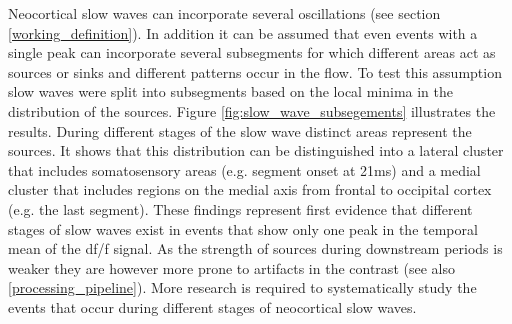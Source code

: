 Neocortical slow waves can incorporate several oscillations (see section \ref{working_definition}). In addition it can be assumed that even events with a single peak can incorporate several subsegments for which different areas act as sources or sinks and different patterns occur in the flow. To test this assumption slow waves were split into subsegments based on the local minima in the distribution of the sources. Figure \ref{fig:slow_wave_subsegements} illustrates the results. During different stages of the slow wave distinct areas represent the sources. It shows that this distribution can be distinguished into a lateral cluster that includes somatosensory areas (e.g. segment onset at 21ms) and a medial cluster that includes regions on the medial axis from frontal to occipital cortex (e.g. the last segment). These findings represent first evidence that different stages of slow waves exist in events that show only one peak in the temporal mean of the df/f signal. As the strength of sources during downstream periods is weaker they are however more prone to artifacts in the contrast (see also \ref{processing_pipeline}). More research is required to systematically study the events that occur during different stages of neocortical slow waves.\\
